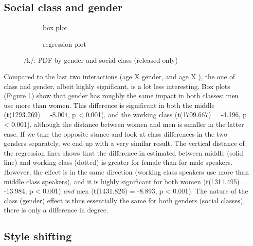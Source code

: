 \subsection{Social class and gender}
\label{sec.prod.res.con.k.classgender}

\begin{figure}[h]
	\centering
	\begin{subfigure}{.49\textwidth}
		\centering
			\resizebox{\linewidth}{!}{} 
		\caption{box plot}
		\label{fig.box.k.classgender}
	\end{subfigure}
	\begin{subfigure}{.49\textwidth}
		\centering
			\resizebox{\linewidth}{!}{} 
		\caption{regression plot}
		\label{fig.scatter.k.classgender}
	\end{subfigure}
	\caption{/k/: PDF by gender and social class (released only)}
\end{figure}

Compared to the last two interactions (age X gender, and age X ), the one of class and gender, albeit highly significant, is a lot less interesting.
Box plots (Figure \ref{fig.box.k.classgender}) show that gender has roughly the same impact in both classes: men use more  than women.
This difference is significant in both the middle (t(1293.269) = -8.004, p < 0.001), and the working class (t(1709.667) = -4.196, p < 0.001), although the distance between women and men is smaller in the latter case.
If we take the opposite stance and look at class differences in the two genders separately, we end up with a very similar result.
The vertical distance of the regression lines shows that the difference in estimated  between middle (solid line) and working class (dotted) is greater for female than for male speakers.
However, the effect is in the same direction (working class speakers use more  than middle class speakers), and it is highly significant for both women (t(1311.495) = -13.984, p < 0.001) \emph{and} men (t(1431.826) = -8.893, p < 0.001).
The nature of the class (gender) effect is thus essentially the same for both genders (social classes), there is only a difference in degree.

\subsection{Style shifting}
\label{sec.prod.res.con.k.shifting}

